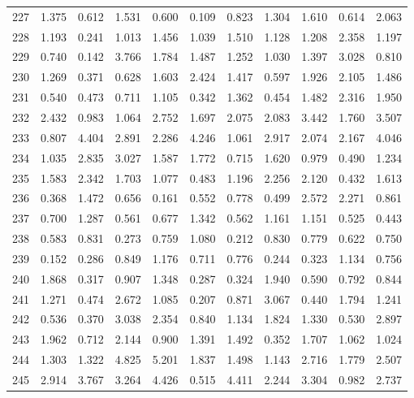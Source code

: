 \begin{tabular}{lrrrrrrrrrr}
227 &  1.375 &  0.612 &  1.531 &  0.600 &  0.109 &  0.823 &  1.304 &  1.610 &  0.614 &  2.063 \\
228 &  1.193 &  0.241 &  1.013 &  1.456 &  1.039 &  1.510 &  1.128 &  1.208 &  2.358 &  1.197 \\
229 &  0.740 &  0.142 &  3.766 &  1.784 &  1.487 &  1.252 &  1.030 &  1.397 &  3.028 &  0.810 \\
230 &  1.269 &  0.371 &  0.628 &  1.603 &  2.424 &  1.417 &  0.597 &  1.926 &  2.105 &  1.486 \\
231 &  0.540 &  0.473 &  0.711 &  1.105 &  0.342 &  1.362 &  0.454 &  1.482 &  2.316 &  1.950 \\
232 &  2.432 &  0.983 &  1.064 &  2.752 &  1.697 &  2.075 &  2.083 &  3.442 &  1.760 &  3.507 \\
233 &  0.807 &  4.404 &  2.891 &  2.286 &  4.246 &  1.061 &  2.917 &  2.074 &  2.167 &  4.046 \\
234 &  1.035 &  2.835 &  3.027 &  1.587 &  1.772 &  0.715 &  1.620 &  0.979 &  0.490 &  1.234 \\
235 &  1.583 &  2.342 &  1.703 &  1.077 &  0.483 &  1.196 &  2.256 &  2.120 &  0.432 &  1.613 \\
236 &  0.368 &  1.472 &  0.656 &  0.161 &  0.552 &  0.778 &  0.499 &  2.572 &  2.271 &  0.861 \\
237 &  0.700 &  1.287 &  0.561 &  0.677 &  1.342 &  0.562 &  1.161 &  1.151 &  0.525 &  0.443 \\
238 &  0.583 &  0.831 &  0.273 &  0.759 &  1.080 &  0.212 &  0.830 &  0.779 &  0.622 &  0.750 \\
239 &  0.152 &  0.286 &  0.849 &  1.176 &  0.711 &  0.776 &  0.244 &  0.323 &  1.134 &  0.756 \\
240 &  1.868 &  0.317 &  0.907 &  1.348 &  0.287 &  0.324 &  1.940 &  0.590 &  0.792 &  0.844 \\
241 &  1.271 &  0.474 &  2.672 &  1.085 &  0.207 &  0.871 &  3.067 &  0.440 &  1.794 &  1.241 \\
242 &  0.536 &  0.370 &  3.038 &  2.354 &  0.840 &  1.134 &  1.824 &  1.330 &  0.530 &  2.897 \\
243 &  1.962 &  0.712 &  2.144 &  0.900 &  1.391 &  1.492 &  0.352 &  1.707 &  1.062 &  1.024 \\
244 &  1.303 &  1.322 &  4.825 &  5.201 &  1.837 &  1.498 &  1.143 &  2.716 &  1.779 &  2.507 \\
245 &  2.914 &  3.767 &  3.264 &  4.426 &  0.515 &  4.411 &  2.244 &  3.304 &  0.982 &  2.737 \\

\end{tabular}
